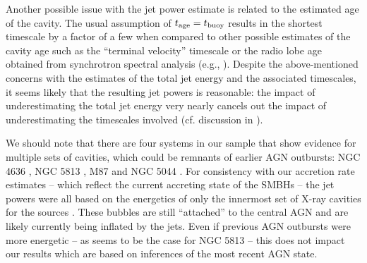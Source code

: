 \documentclass[useAMS,usenatbib]{mn2e}
\begin{document}
Another possible issue with the jet power estimate is related to the estimated age of the cavity. The usual assumption of $t_{\rm age}=t_{\rm buoy}$ results in the shortest timescale by a factor of a few when compared to other possible estimates of the cavity age such as the ``terminal velocity'' timescale \citep{Birzan04,Rafferty06} or the radio lobe age obtained from synchrotron spectral analysis (e.g., \citealt{Hardcastle09,de-Gasperin12}). Despite the above-mentioned concerns with the estimates of the total jet energy and the associated timescales, it seems likely that the resulting jet powers is reasonable: the impact of underestimating the total jet energy very nearly cancels out the impact of underestimating the timescales involved (cf. discussion in \citealt{Nemmen07}). 

We should note that there are four systems in our sample that show evidence for multiple sets of cavities, which could be remnants of earlier AGN outbursts: NGC 4636 \citep{Baldi09}, NGC 5813 \citep{Randall11}, M87 \citep{Forman05} and NGC 5044 \citep{David09}. For consistency with our accretion rate estimates -- which reflect the current accreting state of the SMBHs -- the jet powers were all based on the energetics of only the innermost set of X-ray cavities for the sources \citep{Russell13}. These bubbles are still ``attached'' to the central AGN and are likely currently being inflated by the jets. Even if previous AGN outbursts were more energetic -- as seems to be the case for NGC 5813 \citep{Randall11} -- this does not impact our results which are based on inferences of the most recent AGN state. 

\begin{comment}
mdotbondi is suppressed:\\
* all riaf simulations + \cite{Park09} \\
* pure vorticity: \cite{Krumholz05} \\
* feedback: \cite{Di-Matteo03} \\
* magnetic fields: \cite{Lee14}

mdotbondi is not appropriate: turbulence, fragmentation etc 
\cite{Krumholz06,Gaspari13}
\end{comment}
\end{document}
